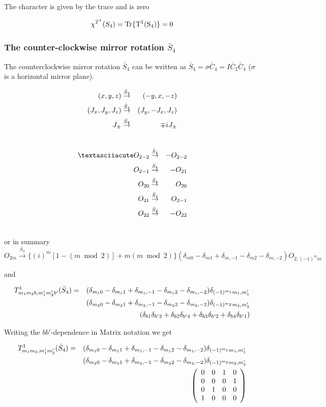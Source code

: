 The character is given by the trace and is zero

\begin{equation}
\chi^{T^1}(S_4)=\rm Tr \{ T^1(S_4) \}=0
\end{equation}


\subsubsection{The counter-clockwise mirror rotation $\bar S_4$}

 The counterclockwise mirror rotation $\bar S_4$ can be written as $\bar S_4=\sigma \bar C_4=I\bar C_2 \bar C_4$ ($\sigma$ is 
a horizontal mirror plane).

\begin{eqnarray}
(x,y,z) &\stackrel{\bar S_4}{\rightarrow}& (-y,x,-z) \\ \nonumber
(J_x,J_y,J_z) &\stackrel{\bar S_4}{\rightarrow}&  (J_y,-J_x,J_z) \\ \nonumber
J_\pm &\stackrel{\bar S_4}{\rightarrow}& \mp iJ_\pm \\ \nonumber
\end{eqnarray}

\begin{eqnarray}
´O_{2-2}&\stackrel{\bar S_4}{\rightarrow}&-O_{2-2} \nn
O_{2-1}&\stackrel{\bar S_4}{\rightarrow}&-O_{21} \nn
O_{20}&\stackrel{\bar S_4}{\rightarrow}&O_{20} \nn
O_{21}&\stackrel{\bar S_4}{\rightarrow}&O_{2-1}\nn
O_{22}&\stackrel{\bar S_4}{\rightarrow}&-O_{22}\nn
\end{eqnarray}

or in summary
\begin{equation}
O_{2m}\stackrel{\bar S_4}{\rightarrow} 
\{(i)^m [1-(m \bmod 2)] +m(m \bmod 2) \} 
(\delta_{m0}-\delta_{m1}+\delta_{m,-1}-\delta_{m2}-\delta_{m,-2})
O_{2,(-1)^mm} 
\end{equation}

and 

\begin{eqnarray}
T^1_{m_1m_2b,m'_1m'_2b'}(\bar S_4)&=&
(\delta_{m_10}-\delta_{m_11}+\delta_{m_1,-1}-\delta_{m_12}-\delta_{m_1,-2})
\delta_{(-1)^{m_1}m_1,m'_1} \\ \nonumber
&&
(\delta_{m_20}-\delta_{m_21}+\delta_{m_2,-1}-\delta_{m_22}-\delta_{m_2,-2})
\delta_{(-1)^{m_2}m_2,m'_2} \\ \nonumber
&&(\delta_{b1}\delta_{b'3}+\delta_{b2}\delta_{b'4}+\delta_{b3}\delta_{b'2}+\delta_{b4}\delta_{b'1})
\end{eqnarray}

Writing the $bb'$-dependence in Matrix notation we get

\begin{eqnarray}\label{bS4}
T^1_{m_1m_2,m'_1m'_2}(\bar S_4)&=&
(\delta_{m_10}-\delta_{m_11}+\delta_{m_1,-1}-\delta_{m_12}-\delta_{m_1,-2})
\delta_{(-1)^{m_1}m_1,m'_1} \\ \nonumber
&&
(\delta_{m_20}-\delta_{m_21}+\delta_{m_2,-1}-\delta_{m_22}-\delta_{m_2,-2})
\delta_{(-1)^{m_2}m_2,m'_2} \\ \nonumber
&&\left (
\begin{array}{cccc}
0 & 0 & 1 & 0 \\
0 & 0 & 0 & 1 \\
0 & 1 & 0 & 0 \\
1 & 0 & 0 & 0 
\end{array} \right )
\end{eqnarray}

